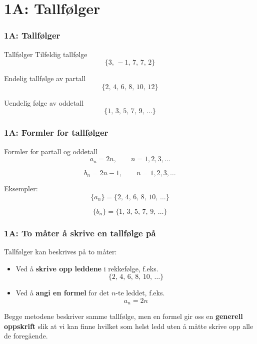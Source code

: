 \section{1A: Tallfølger}

\blueheader
\begin{frame}
\frametitle{1A: Tallfølger}
\begin{blue*}{Tallfølger}
Tilfeldig tallfølge
\begin{equation*}
\{3,\,-1,\,7,\,7,\,2\}
\end{equation*}

Endelig tallfølge av partall
\begin{equation*}
\{2,\,4,\,6,\,8,\,10,\,12\}
\end{equation*}

Uendelig følge av oddetall
\begin{equation*}
\{1,\,3,\,5,\,7,\,9,\,\ldots\}
\end{equation*}
\end{blue*}
\end{frame}

\blueheader
\begin{frame}
\frametitle{1A: Formler for tallfølger}
\begin{blue*}{Formler for partall og oddetall}
\begin{equation*}
a_n = 2n, \qquad n=1,2,3,\ldots
\end{equation*}

\medskip
\begin{equation*}
b_n = 2n-1, \qquad n=1,2,3,\ldots
\end{equation*}

Eksempler:
\begin{equation*}
\{a_n\} = \{2,\,4,\,6,\,8,\,10,\,\ldots\}
\end{equation*}

\medskip
\begin{equation*}
\{b_n\} = \{1,\,3,\,5,\,7,\,9,\,\ldots\}
\end{equation*}
\end{blue*}
\end{frame}

\redheader
\begin{frame}
\frametitle{1A: To måter å skrive en tallfølge på}

Tallfølger kan beskrives på to måter:
\begin{itemize}
    \item Ved å \textbf{skrive opp leddene} i rekkefølge, f.eks. 
    \[
    \{2,\,4,\,6,\,8,\,10,\,\ldots\}
    \]
    \item Ved å \textbf{angi en formel} for det $n$-te leddet, f.eks.
    \[
    a_n = 2n
    \]
\end{itemize}

\medskip
Begge metodene beskriver samme tallfølge, men en formel gir oss en 
\textbf{generell oppskrift} slik at vi kan finne hvilket som helst ledd uten å måtte skrive opp alle de foregående.

\end{frame}

